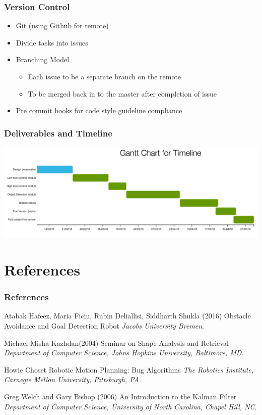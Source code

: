 \documentclass{beamer}
\begin{document}
\begin{frame}
\frametitle{Version Control}
\begin{itemize}
\item Git (using Github for remote)
\item Divide tasks into issues
\item Branching Model
\begin{itemize}
\item Each issue to be a separate branch on the remote
\item To be merged back in to the master after completion of issue
\end{itemize}
\item Pre commit hooks for code style guideline compliance
\end{itemize}
\end{frame}

\begin{frame}
\frametitle{Deliverables and Timeline}
\includegraphics[scale=0.23]{assets/gannt/chart.png}
\end{frame}

\section{References}
\begin{frame}
\frametitle{References}
\footnotesize{
\begin{thebibliography}{99} %
 Atabak Hafeez, Maria Ficiu, Rubin Deliallisi, Siddharth Shukla (2016)
\newblock Obstacle Avoidance and Goal Detection Robot
\newblock \emph{Jacobs University Bremen}.

 Michael Misha Kazhdan(2004)
\newblock Seminar on Shape Analysis and Retrieval
\newblock \emph{Department of Computer Science,
Johns Hopkins University, Baltimore, MD}.

 Howie Choset
\newblock Robotic Motion Planning: Bug Algorithms
\newblock \emph{The Robotics Institute,
Carnegie Mellon University, Pittsburgh, PA}.


 Greg Welch and Gary Bishop (2006)
\newblock An Introduction to the Kalman Filter
\newblock \emph{Department of Computer Science,
University of North Carolina, Chapel Hill, NC}.
\end{thebibliography}
}
\end{frame}

\end{document}
